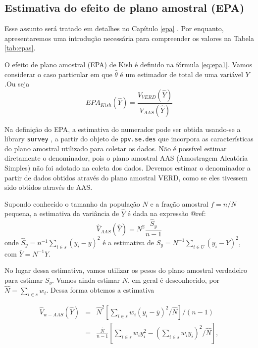 \documentclass[]{book}
\theoremstyle{definition}
\theoremstyle{definition}
\theoremstyle{remark}
\begin{document}
\subsection{Estimativa do efeito de plano amostral
(EPA)}\label{estimativa-do-efeito-de-plano-amostral-epa}

Esse assunto será tratado em detalhes no Capítulo \ref{epa} . Por
enquanto, apresentaremos uma introdução necessária para compreender os
valores na Tabela \ref{tab:epas}.

O efeito de plano amostral (EPA) de Kish é definido na fórmula
\eqref{eq:epa1}. Vamos considerar o caso particular em que
\(\hat{\theta}\) é um estimador de total de uma variável \(Y\).Ou seja
\[
EPA_{Kish}\left(\widehat{Y}\right)=\frac{V_{VERD}\left(\widehat{Y}\right)}{V_{AAS}\left(\widehat{Y}\right)}
\]

Na definição do EPA, a estimativa do numerador pode ser obtida usando-se
a library \texttt{survey} \citep{R-survey}, a partir do objeto de
\texttt{ppv.se.des} que incorpora as características do plano amostral
utilizado para coletar os dados. Não é possível estimar diretamente o
denominador, pois o plano amostral AAS (Amostragem Aleatória Simples)
não foi adotado na coleta dos dados. Devemos estimar o denominador a
partir de dados obtidos através do plano amostral VERD, como se eles
tivessem sido obtidos através de AAS.

Supondo conhecido o tamanho da população \(N\) e a fração amostral
\(f=n/N\) pequena, a estimativa da variância de \(\widehat{Y}\) é dada
na expressão @ref:\label{eq:estpa9} \[
\widehat{V}_{AAS}\left(\widehat{Y}\right)=N^2\frac{\widehat{S}_y}{n-1}
\] onde
\(\widehat{S}_y= n^{-1}\sum_{i\in s}\left(y_i-\overline{y}\right)^2\) é
a estimativa de
\(S_y=N^{-1}\sum_{i\in U}\left(y_i-\overline{Y}\right)^2\), com
\(\overline{Y}=N^{-1}Y\).

No lugar dessa estimativa, vamos utilizar os pesos do plano amostral
verdadeiro para estimar \(S_y\). Vamos ainda estimar \(N\), em geral é
desconhecido, por \(\widehat{N}=\sum_{i \in s} w_i\). Dessa forma
obtemos a estimativa

\begin{eqnarray*}
\widehat{V}_{w-AAS}\left(\widehat{Y}\right)&=& \widehat{N}^2\left[\sum_{i \in s}w_i\left(y_i-\overline{y}\right)^2/\widehat{N}\right]/(n-1)\\
&=&\frac{\widehat{N}}{n-1}\left[\sum_{i \in s}w_iy_i^2-\left(\sum_{i \in s}w_iy_i\right)^2/\widehat{N}\right],
\end{eqnarray*}
\end{document}
